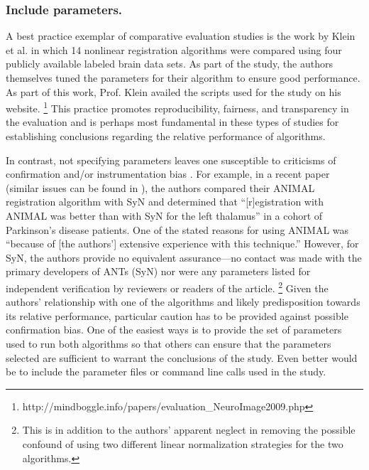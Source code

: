 \documentclass[final,5p,times,twocolumn]{elsarticle}
\newcommand{\trEdit}[1]{{\color{blue}{#1}}}
\begin{document}
\subsubsection{Include parameters.}
A best practice exemplar of comparative evaluation studies
is the work by Klein et al. \cite{Klein2009} in which
14 nonlinear registration algorithms were compared using
four publicly available\trEdit{,} labeled brain \trEdit{MRI} data sets.  
As part of the study, the authors themselves tuned 
the parameters for their algorithm to ensure good
performance.  As
part of this work, Prof. Klein availed the scripts
used for the study on his website.%
\footnote{
http://mindboggle.info/papers/evaluation\_NeuroImage2009.php
}
This practice promotes reproducibility, fairness, and transparency in 
the evaluation and is perhaps most fundamental in these types
of studies for establishing conclusions regarding the relative
performance of algorithms.  

In contrast, not specifying parameters 
leaves one susceptible to criticisms of confirmation and/or 
instrumentation bias \cite{sackett1979}.  For example, in 
a recent paper \cite{haegelen2013} (similar issues can 
be found in \cite{luo2013,wu2013}), the authors compared
their ANIMAL registration algorithm with SyN \cite{avants2011} and determined
that ``[r]egistration with ANIMAL was better than with SyN for 
the left thalamus'' in a cohort of Parkinson's disease patients.
One of the stated reasons for using ANIMAL was ``because of 
[the authors']
extensive experience with this technique.''  However, for SyN,
the authors provide no equivalent assurance---no contact
was made with the primary developers of ANTs (SyN) nor
were any parameters listed for independent verification 
by reviewers or readers of the article.%
\footnote{
This is in addition to the authors' apparent neglect in  
removing the possible confound of using two different linear 
normalization strategies for the two algorithms.
}
Given the authors' relationship with one of the algorithms
and likely predisposition towards its relative performance,
particular caution has to be provided against possible confirmation
bias.  One of the easiest ways is to provide the set of parameters
used to run both algorithms so that others can ensure that 
the parameters selected are sufficient to warrant the conclusions
of the study.  Even better would be to include  the parameter
files or command line calls used in the study.
\end{document}
